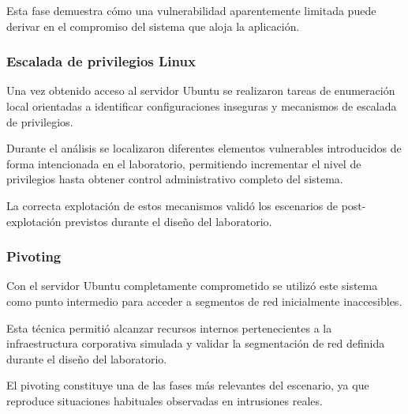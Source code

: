 Esta fase demuestra cómo una vulnerabilidad aparentemente limitada puede derivar en el compromiso del sistema que aloja la aplicación.



\subsubsection{Escalada de privilegios Linux}

Una vez obtenido acceso al servidor Ubuntu se realizaron tareas de enumeración local orientadas a identificar configuraciones inseguras y mecanismos de escalada de privilegios.

Durante el análisis se localizaron diferentes elementos vulnerables introducidos de forma intencionada en el laboratorio, permitiendo incrementar el nivel de privilegios hasta obtener control administrativo completo del sistema.

La correcta explotación de estos mecanismos validó los escenarios de post-explotación previstos durante el diseño del laboratorio.

%


\subsubsection{Pivoting}

Con el servidor Ubuntu completamente comprometido se utilizó este sistema como punto intermedio para acceder a segmentos de red inicialmente inaccesibles.

Esta técnica permitió alcanzar recursos internos pertenecientes a la infraestructura corporativa simulada y validar la segmentación de red definida durante el diseño del laboratorio.

El pivoting constituye una de las fases más relevantes del escenario, ya que reproduce situaciones habituales observadas en intrusiones reales.

